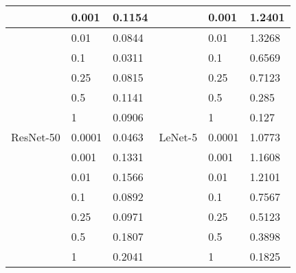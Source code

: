\begin{table}
\begin{tabular}{|l|l|l||l|l|l|}
          & 0.001  & 0.1154                 &           & 0.001  & 1.2401                 \\ \hline
          & 0.01   & 0.0844                 &           & 0.01   & 1.3268                 \\ \hline
          & 0.1    & 0.0311                 &           & 0.1    & 0.6569                 \\ \hline
          & 0.25   & 0.0815                 &           & 0.25   & 0.7123                 \\ \hline
          & 0.5    & 0.1141                 &           & 0.5    & 0.285                  \\ \hline
          & 1      & 0.0906                 &           & 1      & 0.127                  \\ \hline
ResNet-50 & 0.0001 & 0.0463                 & LeNet-5   & 0.0001 & 1.0773                 \\ \hline
          & 0.001  & 0.1331                 &           & 0.001  & 1.1608                 \\ \hline
          & 0.01   & 0.1566                 &           & 0.01   & 1.2101                 \\ \hline
          & 0.1    & 0.0892                 &           & 0.1    & 0.7567                 \\ \hline
          & 0.25   & 0.0971                 &           & 0.25   & 0.5123                 \\ \hline
          & 0.5    & 0.1807                 &           & 0.5    & 0.3898                 \\ \hline
          & 1      & 0.2041                 &           & 1      & 0.1825                 \\ \hline
\end{tabular}
\end{table}